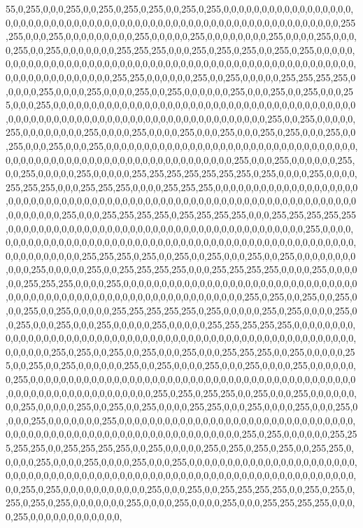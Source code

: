 \begin{DoxyCompactItemize}
55,0,255,0,0,0,255,0,0,255,0,255,0,255,0,0,255,0,255,0,0,0,0,0,0,0,0,0,0,0,0,0,0,0,0,0,0,0,0,0,0,0,0,0,0,0,0,0,0,0,0,0,0,0,0,0,0,0,0,0,0,0,0,0,0,0,0,0,0,0,0,0,0,0,0,0,0,0,0,0,255,255,0,0,0,255,0,0,0,0,0,0,0,0,0,255,0,0,0,0,0,255,0,0,0,0,0,0,0,0,255,0,0,0,0,255,0,0,0,0,255,0,0,255,0,0,0,0,0,0,0,255,255,255,0,0,0,255,0,255,0,255,0,0,255,0,255,0,0,0,0,0,0,0,0,0,0,0,0,0,0,0,0,0,0,0,0,0,0,0,0,0,0,0,0,0,0,0,0,0,0,0,0,0,0,0,0,0,0,0,0,0,0,0,0,0,0,0,0,0,0,0,0,0,0,0,0,0,0,0,0,0,255,255,0,0,0,0,0,0,255,0,0,255,0,0,0,0,0,255,255,255,255,0,0,0,0,0,255,0,0,0,0,255,0,0,0,0,255,0,0,255,0,0,0,0,0,0,255,0,0,0,255,0,0,255,0,0,0,255,0,0,0,255,0,0,0,0,0,0,0,0,0,0,0,0,0,0,0,0,0,0,0,0,0,0,0,0,0,0,0,0,0,0,0,0,0,0,0,0,0,0,0,0,0,0,0,0,0,0,0,0,0,0,0,0,0,0,0,0,0,0,0,0,0,0,0,0,0,0,0,0,0,0,0,0,0,0,255,0,0,255,0,0,0,0,0,255,0,0,0,0,0,0,0,0,255,0,0,0,0,255,0,0,0,0,255,0,0,0,255,0,0,0,255,0,255,0,0,0,255,0,0,255,0,0,0,255,0,0,0,255,0,0,0,0,0,0,0,0,0,0,0,0,0,0,0,0,0,0,0,0,0,0,0,0,0,0,0,0,0,0,0,0,0,0,0,0,0,0,0,0,0,0,0,0,0,0,0,0,0,0,0,0,0,0,0,0,0,0,0,0,0,0,0,255,0,0,0,255,0,0,0,0,0,0,255,0,0,255,0,0,0,0,0,255,0,0,0,0,0,255,255,255,255,255,255,255,0,255,0,0,0,0,255,0,0,0,0,255,255,255,0,0,0,255,255,255,0,0,0,0,255,255,255,0,0,0,0,0,0,0,0,0,0,0,0,0,0,0,0,0,0,0,0,0,0,0,0,0,0,0,0,0,0,0,0,0,0,0,0,0,0,0,0,0,0,0,0,0,0,0,0,0,0,0,0,0,0,0,0,0,0,0,0,0,0,0,0,0,0,0,0,0,0,0,0,255,0,0,0,255,255,255,255,0,255,255,255,255,0,0,0,255,255,255,255,255,0,0,0,0,0,0,0,0,0,0,0,0,0,0,0,0,0,0,0,0,0,0,0,0,0,0,0,0,0,0,0,0,0,0,0,0,0,0,0,255,0,0,0,0,0,0,0,0,0,0,0,0,0,0,0,0,0,0,0,0,0,0,0,0,0,0,0,0,0,0,0,0,0,0,0,0,0,0,0,0,0,0,0,0,0,0,0,0,0,0,0,0,0,0,0,0,0,0,0,0,255,255,255,0,255,0,0,255,0,0,255,0,0,0,255,0,0,255,0,0,0,0,0,0,0,0,0,0,0,255,0,0,0,0,0,255,0,0,255,255,255,255,0,0,0,255,255,255,255,0,0,0,0,255,0,0,0,0,0,0,255,255,255,0,0,0,0,255,0,0,0,0,0,0,0,0,0,0,0,0,0,0,0,0,0,0,0,0,0,0,0,0,0,0,0,0,0,0,0,0,0,0,0,0,0,0,0,0,0,0,0,0,0,0,0,0,0,0,0,0,0,0,0,0,0,0,0,0,0,0,255,0,255,0,0,255,0,0,255,0,0,0,255,0,0,255,0,0,0,0,0,255,255,255,255,255,0,255,0,0,0,0,0,255,0,255,0,0,0,0,255,0,0,255,0,0,0,255,0,0,0,255,0,0,0,0,0,255,0,0,0,0,0,255,255,255,255,255,0,0,0,0,0,0,0,0,0,0,0,0,0,0,0,0,0,0,0,0,0,0,0,0,0,0,0,0,0,0,0,0,0,0,0,0,0,0,0,0,0,0,0,0,0,0,0,0,0,0,0,0,0,0,0,0,0,0,0,0,255,0,255,0,0,255,0,0,255,0,0,0,255,0,0,0,255,255,255,0,0,255,0,0,0,0,0,255,0,0,255,0,0,255,0,0,0,0,0,0,255,0,0,255,0,0,0,0,255,0,0,0,255,0,0,0,0,255,0,0,0,0,0,0,0,255,0,0,0,0,0,0,0,0,0,0,0,0,0,0,0,0,0,0,0,0,0,0,0,0,0,0,0,0,0,0,0,0,0,0,0,0,0,0,0,0,0,0,0,0,0,0,0,0,0,0,0,0,0,0,0,0,0,0,0,0,0,0,255,0,255,0,255,255,0,0,255,0,0,0,255,0,0,0,0,0,0,0,0,255,0,0,0,0,0,255,0,0,255,0,0,255,0,0,0,0,255,255,0,0,0,255,0,0,0,0,255,0,0,0,255,0,0,0,0,255,0,0,0,0,0,0,0,255,0,0,0,0,0,0,0,0,0,0,0,0,0,0,0,0,0,0,0,0,0,0,0,0,0,0,0,0,0,0,0,0,0,0,0,0,0,0,0,0,0,0,0,0,0,0,0,0,0,0,0,0,0,0,0,0,0,0,0,0,0,0,255,0,255,0,0,0,0,0,0,255,255,255,255,0,0,255,255,255,255,0,0,255,0,0,0,0,0,255,0,255,0,255,0,255,0,0,255,255,0,0,0,0,0,255,0,0,0,0,255,0,0,0,0,255,0,0,0,255,0,0,0,0,0,0,0,0,0,0,0,0,0,0,0,0,0,0,0,0,0,0,0,0,0,0,0,0,0,0,0,0,0,0,0,0,0,0,0,0,0,0,0,0,0,0,0,0,0,0,0,0,0,0,0,0,0,0,0,0,0,0,0,0,0,0,0,0,0,0,255,0,255,0,0,0,0,0,0,0,0,0,0,0,255,0,0,0,255,0,0,255,255,255,255,0,0,255,0,255,0,255,0,255,0,255,0,0,0,0,0,0,0,255,0,0,0,0,255,0,0,0,0,255,0,0,0,255,255,255,255,0,0,0,0,255,0,0,0,0,0,0,0,0,0,0,0,0,
\end{DoxyCompactItemize}
